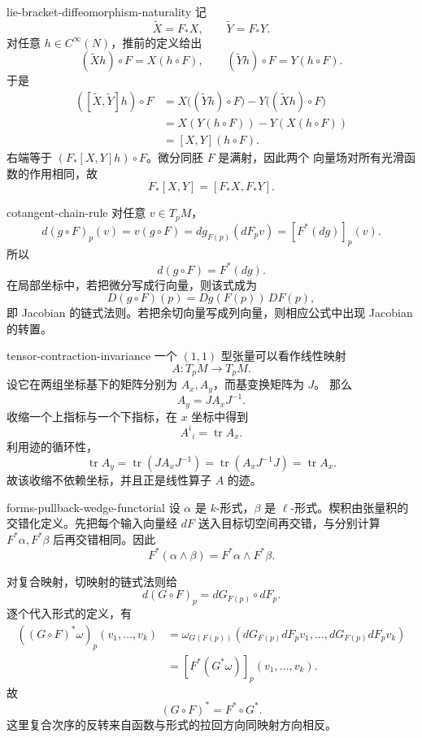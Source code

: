 \begin{solution}{lie-bracket-diffeomorphism-naturality}
记
\[
 \widetilde X=F_*X,\qquad \widetilde Y=F_*Y.
\]
对任意 \(h\in C^\infty(N)\)，推前的定义给出
\[
 (\widetilde Xh)\circ F=X(h\circ F),\qquad
 (\widetilde Yh)\circ F=Y(h\circ F).
\]
于是
\begin{align*}
 ([\widetilde X,\widetilde Y]h)\circ F
 &=X\bigl((\widetilde Yh)\circ F\bigr)
   -Y\bigl((\widetilde Xh)\circ F\bigr)\\
 &=X(Y(h\circ F))-Y(X(h\circ F))\\
 &=[X,Y](h\circ F).
\end{align*}
右端等于 \((F_*[X,Y]h)\circ F\)。微分同胚 \(F\) 是满射，因此两个
向量场对所有光滑函数的作用相同，故
\[
 F_*[X,Y]=[F_*X,F_*Y].
\]
\end{solution}

\begin{solution}{cotangent-chain-rule}
对任意 \(v\in T_pM\)，
\[
 d(g\circ F)_p(v)
 =v(g\circ F)
 =dg_{F(p)}(dF_pv)
 =[F^*(dg)]_p(v).
\]
所以
\[
 d(g\circ F)=F^*(dg).
\]
在局部坐标中，若把微分写成行向量，则该式成为
\[
 D(g\circ F)(p)=Dg(F(p))\,DF(p),
\]
即 Jacobian 的链式法则。若把余切向量写成列向量，则相应公式中出现
Jacobian 的转置。
\end{solution}

\begin{solution}{tensor-contraction-invariance}
一个 \((1,1)\) 型张量可以看作线性映射
\[
 A:T_pM\longrightarrow T_pM.
\]
设它在两组坐标基下的矩阵分别为 \(A_x,A_y\)，而基变换矩阵为 \(J\)。
那么
\[
 A_y=J A_xJ^{-1}.
\]
收缩一个上指标与一个下指标，在 \(x\) 坐标中得到
\[
 A^i{}_i=\operatorname{tr}A_x.
\]
利用迹的循环性，
\[
 \operatorname{tr}A_y
 =\operatorname{tr}(JA_xJ^{-1})
 =\operatorname{tr}(A_xJ^{-1}J)
 =\operatorname{tr}A_x.
\]
故该收缩不依赖坐标，并且正是线性算子 \(A\) 的迹。
\end{solution}

\begin{solution}{forms-pullback-wedge-functorial}
设 \(\alpha\) 是 \(k\)-形式，\(\beta\) 是 \(\ell\)-形式。楔积由张量积的
交错化定义。先把每个输入向量经 \(dF\) 送入目标切空间再交错，与分别计算
\(F^*\alpha,F^*\beta\) 后再交错相同。因此
\[
 F^*(\alpha\wedge\beta)=F^*\alpha\wedge F^*\beta.
\]

对复合映射，切映射的链式法则给
\[
 d(G\circ F)_p=dG_{F(p)}\circ dF_p.
\]
逐个代入形式的定义，有
\begin{align*}
 ((G\circ F)^*\omega)_p(v_1,\ldots,v_k)
 &=\omega_{G(F(p))}
   (dG_{F(p)}dF_pv_1,\ldots,dG_{F(p)}dF_pv_k)\\
 &=[F^*(G^*\omega)]_p(v_1,\ldots,v_k).
\end{align*}
故
\[
 (G\circ F)^*=F^*\circ G^*.
\]
这里复合次序的反转来自函数与形式的拉回方向同映射方向相反。
\end{solution}

